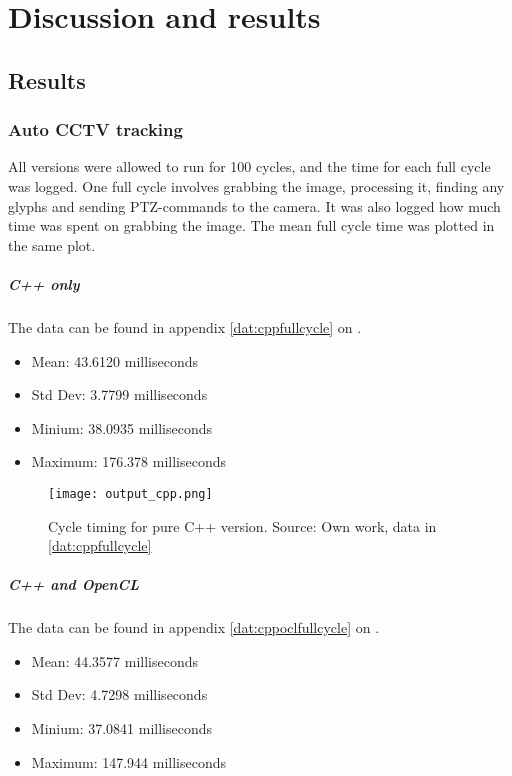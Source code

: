 \chapter{Discussion and results}
\section{Results}
\subsection{Auto CCTV tracking}
All versions were allowed to run for 100 cycles, and the time for each full cycle was logged. One full cycle involves grabbing the image, processing it, finding any glyphs and sending PTZ-commands to the camera. It was also logged how much time was spent on grabbing the image. The mean full cycle time was plotted in the same plot.

\paragraph{C++ only}
The data can be found in appendix \ref{dat:cppfullcycle} on \pageref{dat:cppfullcycle}.

\begin{itemize}
\item Mean: 43.6120 milliseconds
\item Std Dev: 3.7799 milliseconds
\item Minium: 38.0935 milliseconds
\item Maximum: 176.378 milliseconds
\end{itemize}

\begin{figure}[ht]
    \centering
    \texttt{[image: output\_cpp.png]}
    \caption{Cycle timing for pure C++ version. Source: Own work, data in \ref{dat:cppfullcycle}}
    \label{fig:output_cpp}
\end{figure}
\FloatBarrier

\paragraph{C++ and OpenCL}
The data can be found in appendix \ref{dat:cppoclfullcycle} on \pageref{dat:cppoclfullcycle}.
\begin{itemize}
\item Mean: 44.3577 milliseconds
\item Std Dev: 4.7298 milliseconds
\item Minium: 37.0841 milliseconds
\item Maximum: 147.944 milliseconds
\end{itemize}

